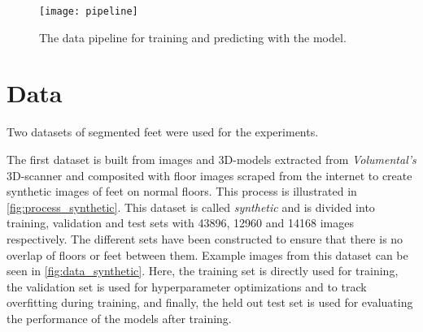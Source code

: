 \documentclass{kththesis}
\begin{document}
\begin{figure}[h]
  \centering
  \texttt{[image: pipeline]}
  \caption{The data pipeline for training and predicting with the model.}
  \label{fig:pipeline}
\end{figure}

\section{Data}
Two datasets of segmented feet were used for the experiments.

The first dataset is built from images and 3D-models extracted from
\textit{Volumental's}
3D-scanner and composited with floor images scraped from the internet to create
synthetic images of feet on normal floors. This process is illustrated in \cref{fig:process_synthetic}.
This dataset is called
\textit{synthetic} and is divided into training, validation and test sets with
43896, 12960 and 14168 images respectively. The different sets have been
constructed to ensure that there is no overlap of floors or feet between them.
Example images from this dataset can be seen in \cref{fig:data_synthetic}. Here,
the training set is directly used for training, the validation set is used for
hyperparameter optimizations and to track overfitting during training, and
finally, the held out test set is used for evaluating the performance of the
models after training.
\end{document}
